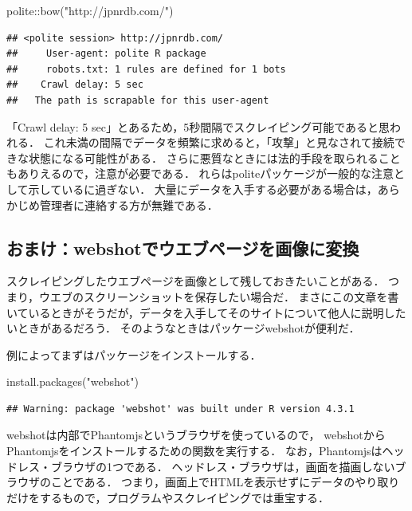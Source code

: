 \documentclass[
]{article}
\newenvironment{Shaded}{\begin{snugshade}}{\end{snugshade}}
\newcommand{\FunctionTok}[1]{\textcolor[rgb]{0.00,0.00,0.00}{#1}}
\newcommand{\NormalTok}[1]{#1}
\newcommand{\SpecialCharTok}[1]{\textcolor[rgb]{0.00,0.00,0.00}{#1}}
\newcommand{\StringTok}[1]{\textcolor[rgb]{0.31,0.60,0.02}{#1}}
\begin{document}
\begin{Shaded}
\begin{Highlighting}[]
\NormalTok{polite}\SpecialCharTok{::}\FunctionTok{bow}\NormalTok{(}\StringTok{"http://jpnrdb.com/"}\NormalTok{)}
\end{Highlighting}
\end{Shaded}

\begin{verbatim}
## <polite session> http://jpnrdb.com/
##     User-agent: polite R package
##     robots.txt: 1 rules are defined for 1 bots
##    Crawl delay: 5 sec
##   The path is scrapable for this user-agent
\end{verbatim}

「Crawl delay: 5 sec」とあるため，5秒間隔でスクレイピング可能であると思われる．
これ未満の間隔でデータを頻繁に求めると，「攻撃」と見なされて接続できな状態になる可能性がある．
さらに悪質なときには法的手段を取られることもありえるので，注意が必要である．
れらはpoliteパッケージが一般的な注意として示しているに過ぎない．
大量にデータを入手する必要がある場合は，あらかじめ管理者に連絡する方が無難である．

\hypertarget{webshot}{%
\subsection{おまけ：webshotでウエブページを画像に変換}\label{webshot}}

スクレイピングしたウエブページを画像として残しておきたいことがある．
つまり，ウエブのスクリーンショットを保存したい場合だ．
まさにこの文章を書いているときがそうだが，データを入手してそのサイトについて他人に説明したいときがあるだろう．
そのようなときはパッケージwebshotが便利だ．

例によってまずはパッケージをインストールする．

\begin{Shaded}
\begin{Highlighting}[]
\FunctionTok{install.packages}\NormalTok{(}\StringTok{"webshot"}\NormalTok{)}
\end{Highlighting}
\end{Shaded}

\begin{verbatim}
## Warning: package 'webshot' was built under R version 4.3.1
\end{verbatim}

webshotは内部でPhantomjsというブラウザを使っているので，
webshotからPhantomjsをインストールするための関数を実行する．
なお，Phantomjsはヘッドレス・ブラウザの1つである．
ヘッドレス・ブラウザは，画面を描画しないブラウザのことである．
つまり，画面上でHTMLを表示せずにデータのやり取りだけをするもので，プログラムやスクレイピングでは重宝する．
\end{document}
